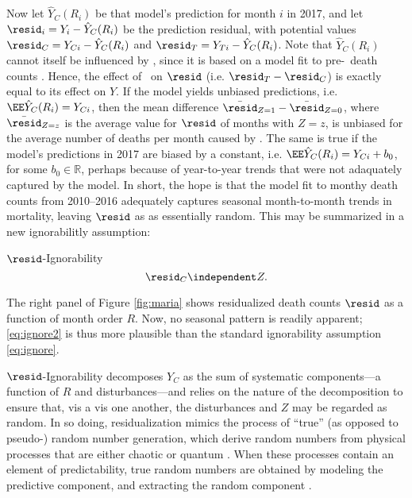 Now let $\hat{Y}_C(R_i)$ be that model's prediction for month $i$ in
2017, and let $\resid_i=Y_i-\hat{Y}_C(R_i)$ be the prediction residual,
with potential values $\resid_C=Y_{Ci}-\hat{Y}_C(R_i)$ and $\resid_T=Y_{Ti}-\hat{Y}_C(R_i)$.
Note that $\hat{Y}_C(R_i)$ cannot itself be influenced by \maria,
since it is based on a model fit to pre-\maria\ death counts \citep[c.f.][]{rebarPaper}.
Hence, the effect of \maria\ on $\resid$ (i.e. $\resid_T-\resid_C$) is exactly equal to its effect on $Y$.
If the model yields unbiased predictions, i.e. $\EE
\hat{Y}_C(R_i)=Y_{Ci}$, then the mean difference
$\bar{\resid}_{Z=1}-\bar{\resid}_{Z=0}$, where $\bar{\resid}_{Z=z}$ is the average
value for $\resid$ of months with $Z=z$, is unbiased for the average number
of deaths per month caused by \maria.
The same is true if the model's predictions in 2017 are biased by a constant,
i.e. $\EE \hat{Y}_C(R_i)=Y_{Ci}+b_0$, for some $b_0\in\mathbb{R}$,
perhaps because of year-to-year trends that were not adaquately
captured by the model.
In short, the hope is that the model fit to monthy death counts from
2010--2016 adequately captures seasonal month-to-month trends in
mortality, leaving $\resid$ as as essentially random.
This may be summarized in a new ignorabilitly assumption:
\begin{ass}{$\resid$-Ignorability}
\begin{equation}\label{eq:ignore2}
\resid_{C} \independent Z.
\end{equation}
\end{ass}
The right panel of Figure \ref{fig:maria} shows residualized death counts $\resid$ as a
function of month order $R$.
Now, no seasonal pattern is readily apparent; \eqref{eq:ignore2} is
thus more plausible than the standard ignorability assumption \eqref{eq:ignore}.

$\resid$-Ignorability decomposes $Y_C$ as the sum of systematic
components---a function of $R$ and disturbances---and relies on the
nature of the decomposition to ensure
that, vis a vis one another, the disturbances and $Z$ may
be regarded as random.
In so doing, residualization mimics the process of ``true'' (as
opposed to pseudo-) random number generation, which derive random
numbers from physical processes that are either chaotic
\citep[e.g.][]{uchida2008fast} or quantum
\citep[e.g.][]{stefanov2000optical}.
When these processes contain an element
of predictability, %
true random numbers are obtained by modeling the predictive component,
and extracting the random component \citep[see, e.g.][]{Nisan1999148}.

